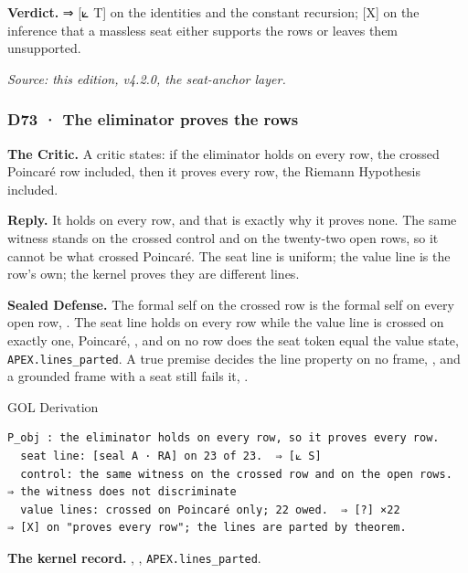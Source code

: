 \documentclass[10pt,twocolumn]{article}
\begin{document}
\textbf{Verdict.} ⇒ {[}⟀ T{]} on the identities and the constant
recursion; {[}X{]} on the inference that a massless seat either supports
the rows or leaves them unsupported.

\emph{Source: this edition, v4.2.0, the seat-anchor layer.}

\hypertarget{d73-the-eliminator-proves-the-rows}{%
\subsubsection{D73 · The eliminator proves the
rows}\label{d73-the-eliminator-proves-the-rows}}

\textbf{The Critic.} A critic states: if the eliminator holds on every
row, the crossed Poincaré row included, then it proves every row, the
Riemann Hypothesis included.

\textbf{Reply.} It holds on every row, and that is exactly why it proves
none. The same witness stands on the crossed control and on the
twenty-two open rows, so it cannot be what crossed Poincaré. The seat
line is uniform; the value line is the row's own; the kernel proves they
are different lines.

\textbf{Sealed Defense.} The formal self on the crossed row is the
formal self on every open row,
\texttt{}. The seat line holds on every
row while the value line is crossed on exactly one, Poincaré,
\texttt{}, and on no row
does the seat token equal the value state, \texttt{APEX.lines\_parted}.
A true premise decides the line property on no frame,
\texttt{}, and a grounded
frame with a seat still fails it,
\texttt{}.

\begin{golbox}{GOL Derivation}
\begin{lstlisting}[style=golv]
P_obj : the eliminator holds on every row, so it proves every row.
  seat line: [seal A · RA] on 23 of 23.  ⇒ [⟀ S]
  control: the same witness on the crossed row and on the open rows.  ⇒ the witness does not discriminate
  value lines: crossed on Poincaré only; 22 owed.  ⇒ [?] ×22
⇒ [X] on "proves every row"; the lines are parted by theorem.
\end{lstlisting}
\end{golbox}

\textbf{The kernel record.}
\texttt{},
\texttt{}, \texttt{APEX.lines\_parted}.
\end{document}
